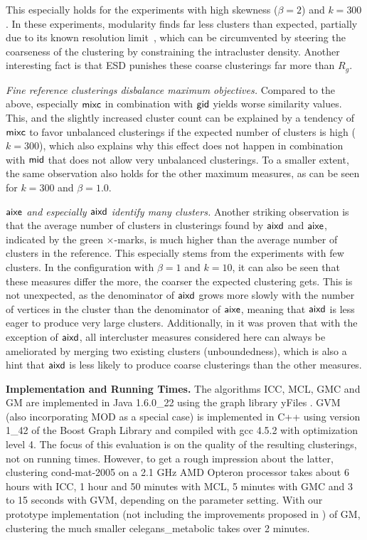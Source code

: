 \documentclass{llncs}
\newcommand{\measure}[1]{\ensuremath{\text{\normalfont{\sffamily {#1}}}}\xspace}
\newcommand{\andreapar}{\vspace*{.5ex}\par\noindent}
\begin{document}
This especially holds for the experiments with high skewness ($\beta=2$) and $k=300$.
In these experiments, modularity finds far less clusters than expected, partially due to its known resolution limit~\cite{bf-rlcd-07}, which can be circumvented by steering the coarseness of the clustering by constraining the intracluster density.
Another interesting fact is that ESD punishes these coarse clusterings far more than $R_g$. 
\par\emph{Fine reference clusterings disbalance maximum objectives.}
Compared to the above,
especially \measure{mixc} in combination with \measure{gid} yields worse similarity values.
This, and the slightly increased cluster count can be explained by a tendency of \measure{mixc} to favor unbalanced clusterings if the expected number of clusters is high ($k=300$), which also explains why this effect does not happen in combination with \measure{mid} that does not allow very unbalanced clusterings.
To a smaller extent, the same observation also holds for the other maximum measures, 
as can be seen for $k=300$ and $\beta=1.0$.
\par\emph{\measure{aixe} and especially \measure{aixd} identify many clusters.}
Another striking observation is that the average number of clusters in clusterings found by \measure{aixd} and \measure{aixe}, indicated by the green $\times$-marks, is much higher than the average number of clusters in the reference.
This especially stems from the experiments with few clusters.
In the configuration with $\beta=1$ and $k=10$, it can also be seen that these measures differ the more, the coarser the expected clustering gets.
This is not unexpected, as the denominator of \measure{aixd} grows more slowly with the number of vertices in the cluster than the denominator of \measure{aixe}, meaning that \measure{aixd} is less eager to produce very large clusters.
Additionally, in \cite{gsw-dcgc-11b} it was proven that with the exception of \measure{aixd}, all intercluster measures considered here can always be ameliorated by merging two existing clusters (unboundedness), which is also a hint that \measure{aixd} is less likely to produce coarse clusterings than the other measures.
\andreapar\textbf{Implementation and Running Times.}
The algorithms ICC, MCL, GMC and GM are implemented in Java 1.6.0\_22 using the graph library yFiles \cite{yfiles}.
GVM (also incorporating MOD as a special case) is implemented in C++ using version 1\_42 of the Boost Graph Library \cite{boost} and compiled with gcc 4.5.2 with optimization level 4.
The focus of this evaluation is on the quality of the resulting clusterings, not on running times.
However, to get a rough impression about the latter, clustering cond-mat-2005 on a 2.1 GHz AMD Opteron processor takes about 6 hours with ICC, 1 hour and 50 minutes with MCL, 5 minutes with GMC and 3 to 15 seconds with GVM, depending on the parameter setting.
With our prototype implementation (not including the improvements proposed in \cite{gsw-dcgc-11b}) of GM, clustering the much smaller celegans\_metabolic takes over 2 minutes.
\end{document}
